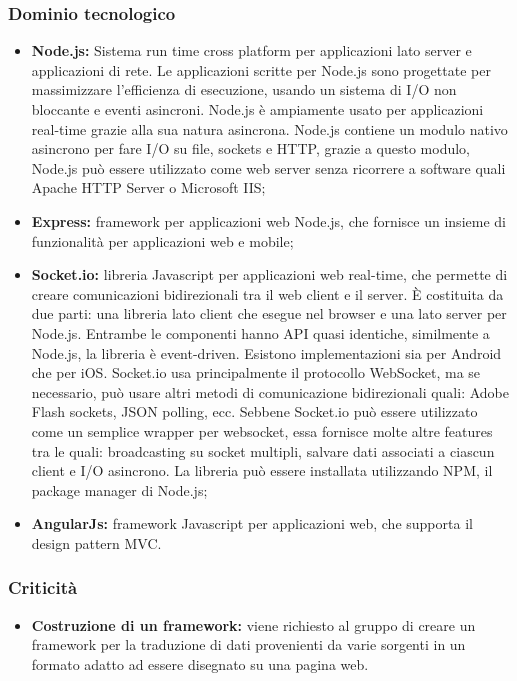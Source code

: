 \subsubsection{Dominio tecnologico}

\begin{itemize}
\item \textbf{Node.js:} Sistema run time cross platform per applicazioni lato server e applicazioni di rete. Le applicazioni scritte per Node.js sono progettate per massimizzare l'efficienza di esecuzione, usando un sistema di I/O non bloccante e eventi asincroni. Node.js è ampiamente usato per applicazioni real-time grazie alla sua natura asincrona. Node.js contiene un modulo nativo asincrono per fare I/O su file, sockets e HTTP, grazie a questo modulo, Node.js può essere utilizzato come web server senza ricorrere a software quali Apache HTTP Server o Microsoft IIS;
\item \textbf{Express:} framework per applicazioni web Node.js, che fornisce un insieme di funzionalità per applicazioni web e mobile;
\item \textbf{Socket.io:} libreria Javascript per applicazioni web real-time, che permette di creare comunicazioni bidirezionali tra il web client e il server. \`E costituita da due parti: una libreria lato client che esegue nel browser e una lato server per Node.js. Entrambe le componenti hanno API quasi identiche, similmente a Node.js, la libreria è event-driven. Esistono implementazioni sia per Android che per iOS. Socket.io usa principalmente il protocollo WebSocket, ma se necessario, può usare altri metodi di comunicazione bidirezionali quali: Adobe Flash sockets, JSON polling, ecc. Sebbene Socket.io può essere utilizzato come un semplice wrapper per websocket, essa fornisce molte altre features tra le quali: broadcasting su socket multipli, salvare dati associati a ciascun client e I/O asincrono. La libreria può essere installata utilizzando NPM, il package manager di Node.js;
\item \textbf{AngularJs:} framework Javascript per applicazioni web, che supporta il design pattern MVC.

\end{itemize}

\subsubsection{Criticità}
\begin{itemize}
\item \textbf{Costruzione di un framework:} viene richiesto al gruppo di creare un framework per la traduzione di dati provenienti da varie sorgenti in un formato adatto ad essere disegnato su una pagina web.
\end{itemize}

